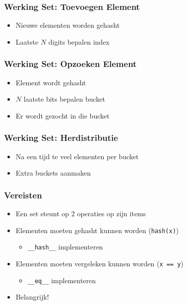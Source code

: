 \documentclass[dutch]{ucll-slides}
\begin{document}
\begin{frame}
  \frametitle{Werking Set: Toevoegen Element}
  \begin{itemize}
    \item Nieuwe elementen worden gehasht
    \item Laatste $N$ digits bepalen index
  \end{itemize}
\end{frame}

\begin{frame}
  \frametitle{Werking Set: Opzoeken Element}
  \begin{itemize}
    \item Element wordt gehasht
    \item $N$ laatste bits bepalen bucket
    \item Er wordt gezocht in die bucket
  \end{itemize}
\end{frame}

\begin{frame}
  \frametitle{Werking Set: Herdistributie}
  \begin{itemize}
    \item Na een tijd te veel elementen per bucket
    \item Extra buckets aanmaken
  \end{itemize}
\end{frame}

\begin{frame}
  \frametitle{Vereisten}
  \begin{itemize}
    \item Een set steunt op 2 operaties op zijn items
    \item Elementen moeten gehasht kunnen worden (\texttt{hash(x)})
          \begin{itemize}
            \item \texttt{\_\_hash\_\_} implementeren
          \end{itemize}
    \item Elementen moeten vergeleken kunnen worden (\texttt{x == y})
          \begin{itemize}
            \item \texttt{\_\_eq\_\_} implementeren
          \end{itemize}
    \item Belangrijk!
          \vskip4mm
          \begin{center} \alert{} \end{center}
  \end{itemize}
\end{frame}
\end{document}
